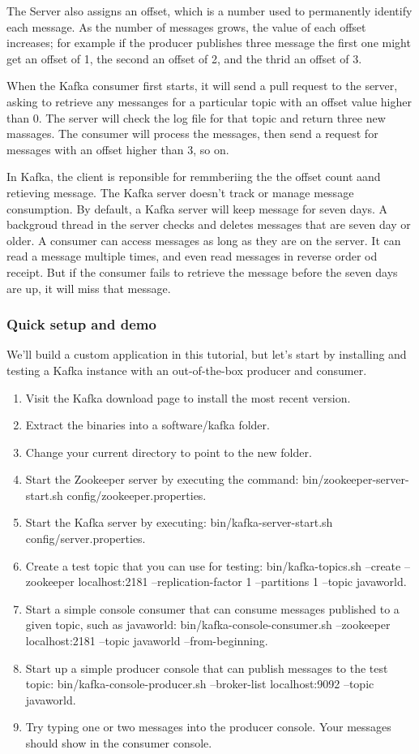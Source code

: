 \documentclass{hcmutarticle}
\begin{document}
The Server also assigns an offset, which is a number used to
permanently identify each message. As the number of messages
grows, the value of each offset increases; for example if the
producer publishes three message the first one might get an
offset of 1, the second an offset of 2, and the thrid an offset
of 3.

When the Kafka consumer first starts, it will send a pull
request to the server, asking to retrieve any messanges for a
particular topic with an offset value higher than 0. The server
will check the log file for that topic and return three new
massages. The consumer will process the messages, then send a
request for messages with an offset higher than 3, so on.



In Kafka, the client is reponsible for remmberiing the the
offset count aand retieving message. The Kafka server doesn't
track or manage message consumption. By default, a Kafka server
will keep message for seven days. A backgroud thread in the
server checks and deletes messages that are seven day or older.
A consumer can access messages as long as they are on the
server. It can read a message multiple times, and even read
messages in reverse order od receipt. But if the consumer fails
to retrieve the message before the seven days are up, it will
miss that message.
\subsubsection{Quick setup and demo}

We'll build a custom application in this tutorial, but let's
start by installing and testing a Kafka instance with an
out-of-the-box producer and consumer.\\
\begin{enumerate}
\item Visit the Kafka download page to install the most recent
version.
  \item Extract the binaries into a software/kafka folder.
\item Change your current directory to point to the new folder.\item Start the Zookeeper server by executing the command:
bin/zookeeper-server-start.sh config/zookeeper.properties.
\item Start the Kafka server by executing:
bin/kafka-server-start.sh config/server.properties.
\item Create a test topic that you can use for testing:
bin/kafka-topics.sh --create --zookeeper localhost:2181
--replication-factor 1 --partitions 1 --topic javaworld.
\item Start a simple console consumer that can consume messages
published to a given topic, such as javaworld:
bin/kafka-console-consumer.sh --zookeeper localhost:2181 --topic
javaworld --from-beginning.
\item Start up a simple producer console that can publish
messages to the test topic: bin/kafka-console-producer.sh
--broker-list localhost:9092 --topic javaworld.
\item Try typing one or two messages into the producer console.
Your messages should show in the consumer console.
\end{enumerate}
\end{document}
